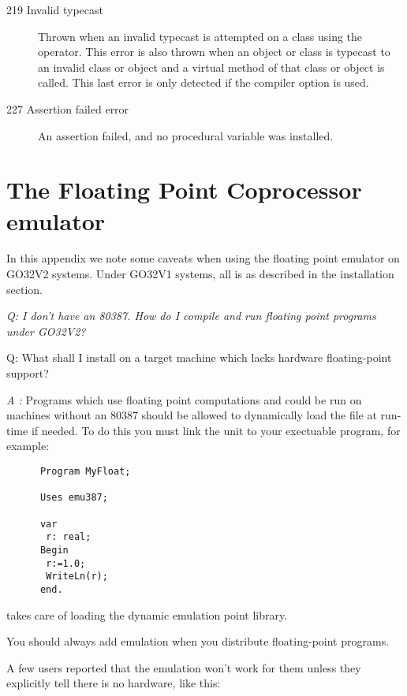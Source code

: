 \begin{description}
\item [219 Invalid typecast]

Thrown when an invalid typecast is attempted on a class using the 
operator. This error is also thrown when an object or class is
typecast to an invalid class or object and a virtual method of
that class or object is called. This last error is only detected
if the  compiler option is used.

\item [227 Assertion failed error]
An assertion failed, and no  procedural variable was 
installed.
\end{description}


\chapter{The Floating Point Coprocessor emulator}

In this appendix we note some caveats when using the floating point
emulator on GO32V2 systems. Under GO32V1 systems, all is as described in
the installation section.

{\em Q: I don't have an 80387. How do I compile and run floating point
   programs under GO32V2?

     Q: What shall I install on a target machine which lacks hardware
   floating-point support?
}

{\em A :}
 Programs which use floating point computations and could be run on
   machines without an 80387 should be allowed to dynamically load the
   file at run-time if needed. To do this you must link the  unit to your
   exectuable program, for example:

\begin{verbatim}
      Program MyFloat;

      Uses emu387;

      var
       r: real;
      Begin
       r:=1.0;
       WriteLn(r);
      end.
\end{verbatim}

    takes care of loading the dynamic emulation point library.

   You should always add emulation when you distribute floating-point
   programs.

   A few users reported that the emulation won't work for them unless
   they explicitly tell  there is no  hardware, like this:

